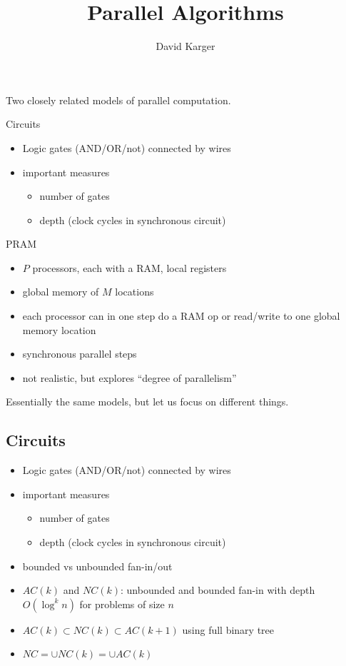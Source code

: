 \documentclass[12pt]{article}
\title{Parallel Algorithms}
\author{David Karger}
\begin{document}

Two closely related models of parallel computation.

Circuits
\begin{itemize}
\item Logic gates (AND/OR/not) connected by wires
\item important measures
\begin{itemize}
\item number of gates
\item depth (clock cycles in synchronous circuit)
\end{itemize}
\end{itemize}

PRAM
\begin{itemize}
\item $P$ processors, each with a RAM, local registers
\item global memory of $M$ locations
\item each processor can in one step do a RAM op or read/write to one
  global memory location
\item synchronous parallel steps
\item not realistic, but explores ``degree of parallelism''
\end{itemize}

Essentially the same models, but let us focus on different things.

\subsection*{Circuits}

\begin{itemize}
\item Logic gates (AND/OR/not) connected by wires
\item important measures
\begin{itemize}
\item number of gates
\item depth (clock cycles in synchronous circuit)
\end{itemize}
\item bounded vs unbounded fan-in/out
\item $AC(k)$ and $NC(k)$: unbounded and bounded fan-in with depth
  $O(\log^k n)$ for problems of size $n$
\item $AC(k) \subset NC(k) \subset AC(k+1)$ using full binary tree
\item $NC=\cup NC(k)=\cup AC(k)$
\end{itemize}
\end{document}
